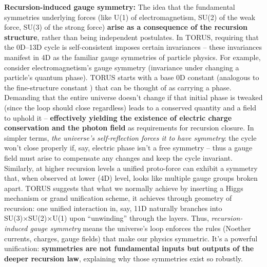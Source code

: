 \documentclass[
]{article}
\begin{document}
\textbf{Recursion-induced gauge symmetry:} The idea that the fundamental
symmetries underlying forces (like U(1) of electromagnetism, SU(2) of
the weak force, SU(3) of the strong force) \textbf{arise as a
consequence of the recursion structure}, rather than being independent
postulates. In TORUS, requiring that the 0D--13D cycle is
self-consistent imposes certain invariances -- these invariances
manifest in 4D as the familiar gauge symmetries of particle
physics\hspace{0pt}. For example, consider electromagnetism's gauge
symmetry (invariance under changing a particle's quantum phase). TORUS
starts with a base 0D constant (analogous to the fine-structure constant
\alpha) that can be thought of as carrying a phase. Demanding that the entire
universe doesn't change if that initial phase is tweaked (since the loop
should close regardless) leads to a conserved quantity and a field to
uphold it -- \textbf{effectively yielding the existence of electric
charge conservation and the photon field} as requirements for recursion
closure\hspace{0pt}. In simpler terms, \emph{the universe's
self-reflection forces it to have symmetry}: the cycle won't close
properly if, say, electric phase isn't a free symmetry -- thus a gauge
field must arise to compensate any changes and keep the cycle invariant.
Similarly, at higher recursion levels a unified proto-force can exhibit
a symmetry that, when observed at lower (4D) level, looks like multiple
gauge groups broken apart\hspace{0pt}. TORUS suggests that what we
normally achieve by inserting a Higgs mechanism or grand unification
scheme, it achieves through geometry of recursion: one unified
interaction in, say, 11D naturally branches into SU(3)×SU(2)×U(1) upon
``unwinding'' through the layers\hspace{0pt}. Thus,
\emph{recursion-induced gauge symmetry} means the universe's loop
enforces the rules (Noether currents, charges, gauge fields) that make
our physics symmetric. It's a powerful unification: \textbf{symmetries
are not fundamental inputs but outputs of the deeper recursion law},
explaining why those symmetries exist so robustly.
\end{document}
